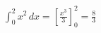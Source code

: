 \documentclass[preview]{standalone}
\begin{document}
\begin{center}
$\int_{0}^{2} x^2 \, dx = \left[\frac{x^3}{3}\right]_0^2 = \frac{8}{3}$
\end{center}
\end{document}
